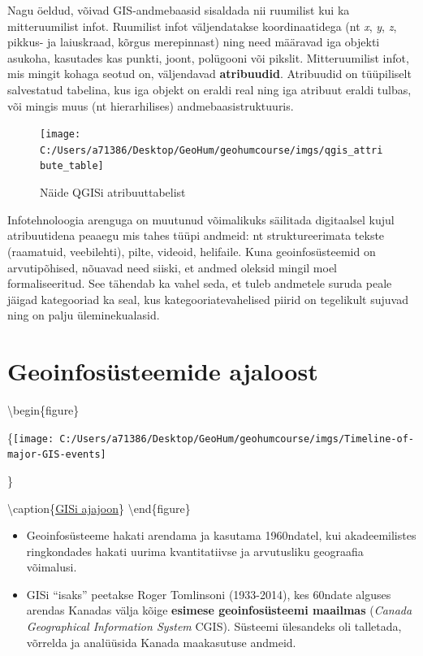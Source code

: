 \documentclass[
]{book}
\providecommand{\tightlist}{%
  \setlength{\itemsep}{0pt}\setlength{\parskip}{0pt}}
\begin{document}
Nagu öeldud, võivad GIS-andmebaasid sisaldada nii ruumilist kui ka mitteruumilist infot. Ruumilist infot väljendatakse koordinaatidega (nt \emph{x}, \emph{y}, \emph{z}, pikkus- ja laiuskraad, kõrgus merepinnast) ning need määravad iga objekti asukoha, kasutades kas punkti, joont, polügooni või pikslit. Mitteruumilist infot, mis mingit kohaga seotud on, väljendavad \textbf{atribuudid}. Atribuudid on tüüpiliselt salvestatud tabelina, kus iga objekt on eraldi real ning iga atribuut eraldi tulbas, või mingis muus (nt hierarhilises) andmebaasistruktuuris.

\begin{figure}

{\centering \texttt{[image: C:/Users/a71386/Desktop/GeoHum/geohumcourse/imgs/qgis\_attribute\_table]} 

}

\caption{Näide QGISi atribuuttabelist}\label{fig:attribute-table}
\end{figure}

Infotehnoloogia arenguga on muutunud võimalikuks säilitada digitaalsel kujul atribuutidena peaaegu mis tahes tüüpi andmeid: nt struktureerimata tekste (raamatuid, veebilehti), pilte, videoid, helifaile. Kuna geoinfosüsteemid on arvutipõhised, nõuavad need siiski, et andmed oleksid mingil moel formaliseeritud. See tähendab ka vahel seda, et tuleb andmetele suruda peale jäigad kategooriad ka seal, kus kategooriatevahelised piirid on tegelikult sujuvad ning on palju üleminekualasid.

\hypertarget{geoinfosuxfcsteemide-ajaloost}{%
\section{Geoinfosüsteemide ajaloost}\label{geoinfosuxfcsteemide-ajaloost}}

\textbackslash begin\{figure\}

\{\centering \texttt{[image: C:/Users/a71386/Desktop/GeoHum/geohumcourse/imgs/Timeline-of-major-GIS-events]}

\}

\textbackslash caption\{\href{https://www.researchgate.net/figure/Timeline-of-major-GIS-events_fig1_315640751}{GISi ajajoon}\}\label{fig:ajajoon}
\textbackslash end\{figure\}

\begin{itemize}
\tightlist
\item
  Geoinfosüsteeme hakati arendama ja kasutama 1960ndatel, kui akadeemilistes ringkondades hakati uurima kvantitatiivse ja arvutusliku geograafia võimalusi.\\
\item
  GISi ``isaks'' peetakse Roger Tomlinsoni (1933-2014), kes 60ndate alguses arendas Kanadas välja kõige \textbf{esimese geoinfosüsteemi maailmas} (\emph{Canada Geographical Information System} CGIS). Süsteemi ülesandeks oli talletada, võrrelda ja analüüsida Kanada maakasutuse andmeid.
\end{itemize}
\end{document}
